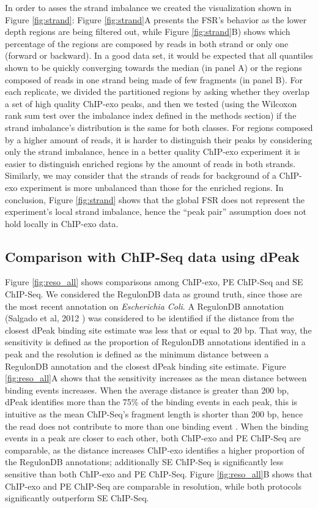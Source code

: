 \documentclass{bmcart}\usepackage[]{graphicx}\usepackage[]{color}
\begin{document}
In order to asses the strand imbalance we created the visualization
shown in Figure \ref{fig:strand}: Figure \ref{fig:strand}A presents
the FSR's behavior as the lower depth regions are being filtered out,
while Figure \ref{fig:strand}B) shows which percentage of the regions
are composed by reads in both strand or only one (forward or
backward). In a good data set, it would be expected that all quantiles
shown to be quickly converging towards the median (in panel A) or the
regions composed of reads in one strand being made of few fragments
(in panel B). For each replicate, we divided the partitioned regions
by asking whether they overlap a set of high quality ChIP-exo peaks,
and then we tested (using the Wilcoxon rank sum test over the
imbalance index defined in the methods section) if the strand
imbalance's distribution is the same for both classes. For regions
composed by a higher amount of reads, it is harder to distinguish
their peaks by considering only the strand imbalance, hence in a
better quality ChIP-exo experiment it is easier to distinguish
enriched regions by the amount of reads in both strands. Similarly, we
may consider that the strands of reads for background of a ChIP-exo
experiment is more unbalanced than those for the enriched regions. In
conclusion, Figure \ref{fig:strand} shows that the global FSR does not
represent the experiment's local strand imbalance, hence the ``peak
pair'' assumption does not hold locally in ChIP-exo data. 

\subsection{Comparison with ChIP-Seq data using dPeak}



Figure \ref{fig:reso_all} shows comparisons among ChIP-exo, PE
ChIP-Seq and SE ChIP-Seq. We considered the RegulonDB data as ground
truth, since those are the most recent annotation on \emph{Escherichia
  Coli}. A RegulonDB annotation (Salgado et al, 2012 \cite{regulondb})
was considered to be identified if the distance from the closest dPeak
binding site estimate was less that or equal to $20$
bp. That way, the sensitivity is defined as the proportion of
RegulonDB annotations identified in a peak and the resolution is
defined as the minimum distance between a RegulonDB annotation and the
closest dPeak binding site estimate. Figure \ref{fig:reso_all}A shows
that the sensitivity increases as the mean distance between binding
events increases. When the average distance is greater than 200 bp,
dPeak identifies more than the 75\% of the binding events in each
peak, this is intuitive as the mean ChIP-Seq's fragment length is
shorter than 200 bp, hence the read does not contribute to more than
one binding event \cite{dpeak}. When the binding events in a peak are
closer to each other, both ChIP-exo and PE ChIP-Seq are comparable, as
the distance increases ChIP-exo identifies a higher proportion of the
RegulonDB annotations; additionally SE ChIP-Seq is significantly less
sensitive than both ChIP-exo and PE ChIP-Seq. Figure
\ref{fig:reso_all}B shows that ChIP-exo and PE ChIP-Seq are comparable
in resolution, while both protocols significantly outperform SE
ChIP-Seq.
\end{document}

